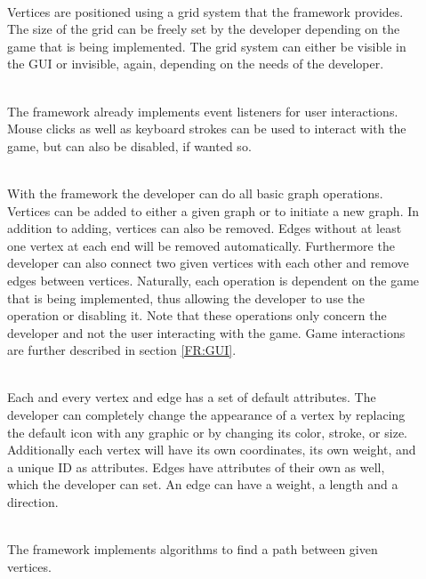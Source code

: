 \begin{description}
	\item[] \textbf{} \\
	Vertices are positioned using a grid system that the \gls{framework} provides. The size of the grid can be freely set by the developer depending on the game that is being implemented. The grid system can either be visible in the \gls{GUI} or invisible, again, depending on the needs of the developer.
	\item[] \textbf{} \\
	The framework already implements event listeners for user interactions. Mouse clicks as well as keyboard strokes can be used to interact with the game, but can also be disabled, if wanted so.
  	\item[] \textbf{} \\
	With the framework the developer can do all basic graph operations. Vertices can be added to either a given graph or to initiate a new graph. In addition to adding, vertices can also be removed. Edges without at least one vertex at each end will be removed automatically. Furthermore the developer can also connect two given vertices with each other and remove edges between vertices. Naturally, each operation is dependent on the game that is being implemented, thus allowing the developer to use the operation or disabling it. Note that these operations only concern the developer and not the user interacting with the game. Game interactions are further described in section \ref{FR:GUI}.
	\item[] \textbf{} \\
	Each and every vertex and edge has a set of default attributes. The developer can completely change the appearance of a vertex by replacing the default icon with any graphic or by changing its color, stroke, or size. Additionally each vertex will have its own coordinates, its own weight, and a unique \gls{ID} as attributes. Edges have attributes of their own as well, which the developer can set. An edge can have a weight, a length and a direction.
	\item[] \textbf{} \\
	The framework implements algorithms to find a \gls{path} between given vertices.

\end{description}
